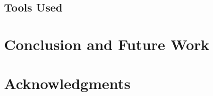 \documentclass[11pt]{article}
\begin{document}
\subsection{Tools Used}
 
\section{Conclusion and Future Work}
\section*{Acknowledgments}

\end{document}
